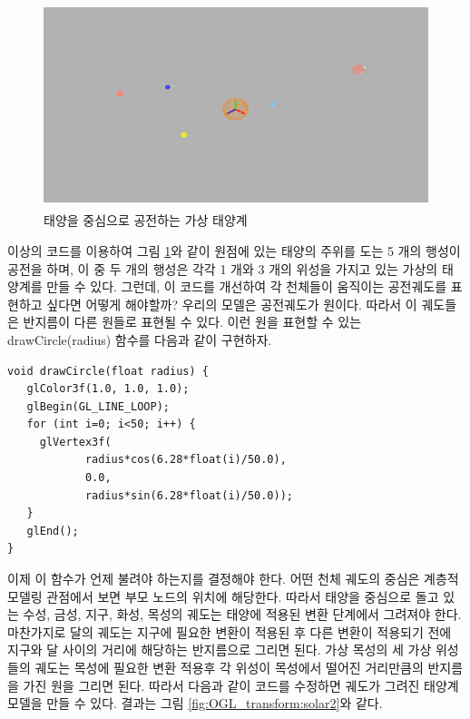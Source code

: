 \begin{figure}[h!]
  \centering
    \includegraphics[height=6cm]{OGL_transform/solar1.png}
    \caption{태양을 중심으로 공전하는 가상 태양계}
    \label{fig:OGL_transform:solar1}
\end{figure}

이상의 코드를 이용하여 그림 \ref{fig:OGL_transform:solar1}와 같이 원점에 있는 태양의 주위를 도는 5 개의 행성이 공전을 하며, 이 중 두 개의 행성은 각각 1 개와 3 개의 위성을 가지고 있는 가상의 태양계를 만들 수 있다. 그런데, 이 코드를 개선하여 각 천체들이 움직이는 공전궤도를 표현하고 싶다면 어떻게 해야할까?
우리의 모델은 공전궤도가 원이다. 따라서 이 궤도들은 반지름이 다른 원들로 표현될 수 있다. 이런 원을 표현할 수 있는  drawCircle(radius)  함수를 다음과 같이 구현하자.

\begin{algorithmbis}\label{code:OGL_transform:circleDraw}
\lstset{language=C++} 
\begin{lstlisting}
void drawCircle(float radius) {
   glColor3f(1.0, 1.0, 1.0);
   glBegin(GL_LINE_LOOP);
   for (int i=0; i<50; i++) {
     glVertex3f(
            radius*cos(6.28*float(i)/50.0), 
            0.0, 
            radius*sin(6.28*float(i)/50.0));
   }
   glEnd();
}
\end{lstlisting}
\end{algorithmbis}

이제 이 함수가 언제 불려야 하는지를 결정해야 한다. 어떤 천체 궤도의 중심은 계층적 모델링 관점에서 보면 부모 노드의 위치에 해당한다. 따라서 태양을 중심으로 돌고 있는 수성, 금성, 지구, 화성, 목성의 궤도는 태양에 적용된 변환 단계에서 그려져야 한다. 마찬가지로 달의 궤도는 지구에 필요한 변환이 적용된 후 다른 변환이 적용되기 전에 지구와 달 사이의 거리에 해당하는 반지름으로 그리면 된다. 가상 목성의 세 가상 위성들의 궤도는 목성에 필요한 변환 적용후 각 위성이 목성에서 떨어진 거리만큼의 반지름을 가진 원을 그리면 된다. 따라서 다음과 같이 코드를 수정하면 궤도가 그려진 태양계 모델을 만들 수 있다. 결과는 그림 \ref{fig:OGL_transform:solar2}와 같다.

